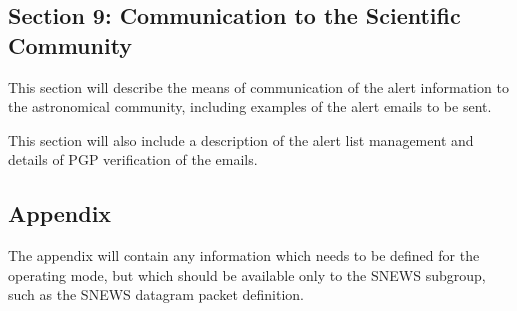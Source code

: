 \documentclass{article}
\begin{document}
\subsection*{Section 9: Communication to the Scientific Community}

This section will describe the means of communication
of the alert information to the astronomical community, including
examples of the alert emails to be sent.

This section will also include a description of the alert list management
and details of PGP verification of the emails.


\subsection{Appendix}

The appendix will contain any information which needs to be defined
for the operating mode, but which should be available only
to the SNEWS subgroup, such as the SNEWS datagram packet definition.
\end{document}
